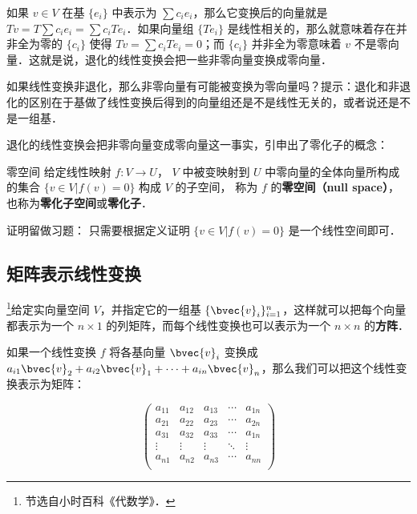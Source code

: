 如果 ${v}\in V$ 在基 $\{{e}_i\}$ 中表示为 $\sum c_i {e}_i$，那么它变换后的向量就是 $T {v}=T\sum c_i {e}_i=\sum c_iT {e}_i$．如果向量组 $\{T {e}_i\}$ 是线性相关的，那么就意味着存在并非全为零的 $\{c_i\}$ 使得 $T {v}=\sum c_iT {e}_i=0$；而 $\{c_i\}$ 并非全为零意味着 ${v}$ 不是零向量．这就是说，退化的线性变换会把一些非零向量变换成零向量．

\begin{exercise}{}
如果线性变换非退化，那么非零向量有可能被变换为零向量吗？提示：退化和非退化的区别在于基做了线性变换后得到的向量组还是不是线性无关的，或者说还是不是一组基．
\end{exercise}

退化的线性变换会把非零向量变成零向量这一事实，引申出了零化子的概念：

\begin{theorem}{零空间}\label{LinMap_the1}
给定线性映射 $f:V\to U$， $V$ 中被变映射到 $U$ 中零向量的全体向量所构成的集合 $\{{v}\in V|f(v)= 0\}$ 构成 $V$ 的子空间， 称为 $f$ 的\textbf{零空间（null space）}， 也称为\textbf{零化子空间}或\textbf{零化子}．
\end{theorem}
证明留做习题： 只需要根据定义证明 $\{{v}\in V|f(v)= 0\}$ 是一个线性空间即可． 


\subsection{矩阵表示线性变换}

\footnote{节选自小时百科《代数学》．}给定实向量空间 $V$，并指定它的一组基 $\{\bvec{v}_i\}_{i=1}^n$，这样就可以把每个向量都表示为一个 $n\times 1$ 的列矩阵，而每个线性变换也可以表示为一个 $n\times n$ 的\textbf{方阵}．

如果一个线性变换 $f$ 将各基向量 $\bvec{v}_i$ 变换成 $a_{i1}\bvec{v}_2+a_{i2}\bvec{v}_1+\cdots+a_{in}\bvec{v}_n$，那么我们可以把这个线性变换表示为矩阵：

\begin{equation}
    \begin{pmatrix}
    a_{11}&a_{12}&a_{13}&\cdots&a_{1n}\\
    a_{21}&a_{22}&a_{23}&\cdots&a_{2n}\\
    a_{31}&a_{32}&a_{33}&\cdots&a_{1n}\\
    \vdots&\vdots&\vdots&\ddots&\vdots\\
    a_{n1}&a_{n2}&a_{n3}&\cdots&a_{nn}\\
    \end{pmatrix}
\end{equation}


